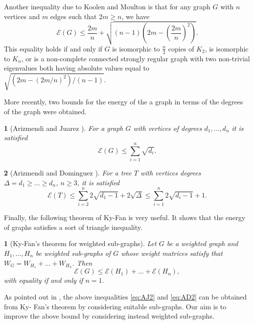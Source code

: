 \documentclass[a4paper]{article}
\newcommand{\energy}[1]{\mathcal{E}\left(#1\right)}
\theoremstyle{plain}
\newtheorem{proposition}{\protect\propname}
\newtheorem{theorem}{\protect\thmaname}
\renewcommand{\propname}{Proposition}
\renewcommand{\thmaname}{Theorem}%
\renewcommand{\propname}{Proposici\'on}
\renewcommand{\thmaname}{Teorema}%
\begin{document}
Another inequality due to Koolen and Moulton \cite{Koolen01} is that for any graph \(G\) with \(n\) vertices and \(m\) edges such that \(2m \geq n\), we have
\begin{equation}\label{Koolen}
    \energy G \leq \frac{2m}{n} + \sqrt{(n-1)\left(2m - \left(\frac{2m}{n}\right)^2\right)}.
\end{equation}
This equality holds if and only if \(G\) is isomorphic to \(\frac{n}{2}\) copies of \(K_2\), is isomorphic to \(K_n\), or is a non-complete connected strongly regular graph with two non-trivial eigenvalues both having absolute values equal to \(\sqrt{(2m - (2m/n)^2)/(n-1)}\).

More recently, two bounds for the energy of the a graph in terms of the degrees of the graph were obtained.

\begin{proposition}[Arizmendi and Juarez \cite{Arizmendi18}]\label{eq:AJ}
For a graph \(G\) with vertices of degrees \(d_1, \ldots, d_n\) it is satisfied
\begin{equation}\label{eq:AJ2}
    \energy G \leq \sum_{i = 1}^n \sqrt{d_i}.
\end{equation}

\end{proposition}

\begin{proposition}[Arizmendi and Dominguez \cite{Arizmendi22}]\label{eq:AD}
For a tree \(T\) with vertices degrees \(\Delta = d_1 \geq \ldots \geq d_n\), \(n \geq 3\), it is satisfied
\begin{equation}\label{eq:AD2}
    \energy T \leq \sum_{i = 2}^n 2\sqrt{d_1 - 1} + 2\sqrt{\Delta} \leq \sum_{i = 1}^n 2\sqrt{d_i - 1} + 1.
\end{equation}

\end{proposition}

Finally, the following theorem of Ky-Fan is very useful. It shows that the energy of graphs satisfies a sort of triangle inequality. 
\begin{theorem}[Ky-Fan's theorem for weighted sub-graphs]
    Let \(G\) be a weighted graph and \(H_1, \ldots, H_n\) be weighted sub-graphs of \(G\) whose weight matrices satisfy that \(W_G = W_{H_1} + \ldots + W_{H_n}\). Then
    \[
        \energy{G} \leq \energy{H_1} + \ldots + \energy{H_n},
    \]
    with equality if and only if \(n = 1\).
\end{theorem}

As pointed out in \cite{Arizmendi22}, the above inequalities \eqref{eq:AJ2} and \eqref{eq:AD2} can be obtained from Ky- Fan's theorem by considering suitable sub-graphs. Our aim is to improve the above bound by considering instead weighted sub-graphs.
\end{document}
